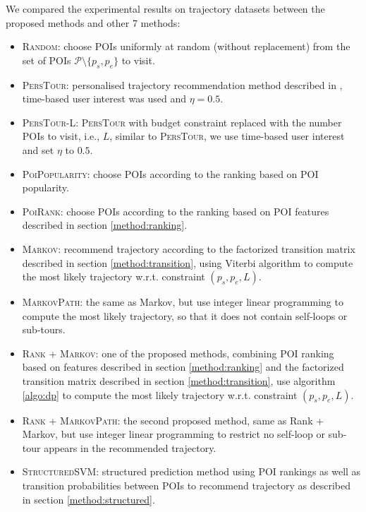 We compared the experimental results on trajectory datasets between the proposed methods and other 7 methods:
\begin{itemize}
\item \textsc{Random}: choose POIs uniformly at random (without replacement) 
      from the set of POIs $\mathcal{P} \setminus \{p_s, p_e \}$ to visit.
\item \textsc{PersTour}\cite{ijcai15}: personalised trajectory recommendation method described in \cite{ijcai15}, 
      time-based user interest was used and $\eta = 0.5$.
\item \textsc{PersTour-L}: \textsc{PersTour}\cite{ijcai15} with budget constraint replaced with the number POIs to visit, i.e., $L$,
      similar to \textsc{PersTour}, we use time-based user interest and set $\eta$ to $0.5$.
\item \textsc{PoiPopularity}: choose POIs according to the ranking based on POI popularity.
\item \textsc{PoiRank}: choose POIs according to the ranking based on POI features described in section \ref{method:ranking}.
\item \textsc{Markov}: recommend trajectory according to the factorized transition matrix described in section \ref{method:transition},
      using Viterbi algorithm to compute the most likely trajectory w.r.t. constraint $(p_s, p_e, L)$.
\item \textsc{MarkovPath}: the same as Markov, but use integer linear programming to compute the most likely trajectory,
      so that it does not contain self-loops or sub-tours.
\item \textsc{Rank} + \textsc{Markov}: one of the proposed methods, combining POI ranking based on features 
      described in section \ref{method:ranking} and the factorized transition matrix described in section \ref{method:transition},
      use algorithm \ref{algo:dp} to compute the most likely trajectory w.r.t. constraint $(p_s, p_e, L)$.
\item \textsc{Rank} + \textsc{MarkovPath}: the second proposed method, same as Rank + Markov,
      but use integer linear programming to restrict no self-loop or sub-tour appears in the recommended trajectory.
\item \textsc{StructuredSVM}: structured prediction method using POI rankings as well as transition probabilities
      between POIs to recommend trajectory as described in section \ref{method:structured}.
\end{itemize}

